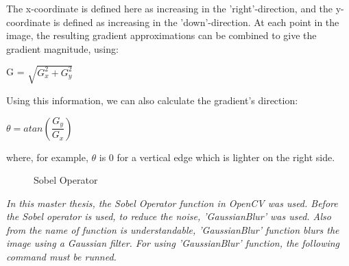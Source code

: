 The x-coordinate is defined here as increasing in the 'right'-direction, and the y-coordinate is defined as increasing in the 'down'-direction. At each point in the image, the resulting gradient approximations can be combined to give the gradient magnitude, using:

\begin{center}
G = $\sqrt{ G_{x}^{2} + G_{y}^{2} }$
\end{center}

Using this information, we can also calculate the gradient's direction:

\begin{center}
$\theta = atan(\dfrac{G_{y}}{G_{x}})$
\end{center}

where, for example, $\theta$ is 0 for a vertical edge which is lighter on the right side.\cite{Sobel_Operator}


\begin{figure}[H]
  \centering
  \hfill
  \caption{Sobel Operator\cite{Sobel_Operator}}
\end{figure} 


\emph{\color{blue}In this master thesis, the Sobel Operator function in OpenCV was used. Before the Sobel operator is used, to reduce the noise, 'GaussianBlur' was used. Also from the name of function is understandable, 'GaussianBlur' function blurs the image using a Gaussian filter. For using 'GaussianBlur' function, the following command must be runned.}

